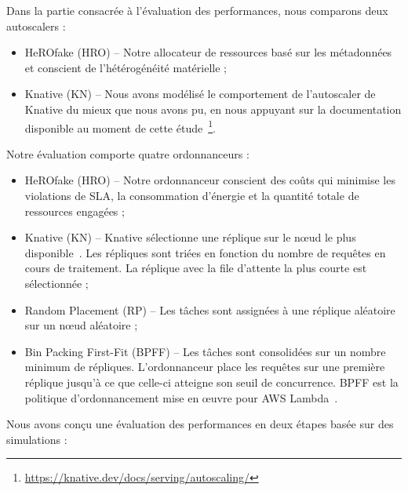 Dans la partie consacrée à l'évaluation des performances, nous comparons deux autoscalers :

\begin{itemize}
    \item HeROfake (HRO) -- Notre allocateur de ressources basé sur les métadonnées et conscient de l'hétérogénéité matérielle ;
    \item Knative (KN) -- Nous avons modélisé le comportement de l'autoscaler de Knative du mieux que nous avons pu, en nous appuyant sur la documentation disponible au moment de cette étude~\footnote{\href{https://knative.dev/docs/serving/autoscaling/}{https://knative.dev/docs/serving/autoscaling/}}.
\end{itemize}

Notre évaluation comporte quatre ordonnanceurs :

\begin{itemize}
    \item HeROfake (HRO) -- Notre ordonnanceur conscient des coûts qui minimise les violations de \gls{SLA}, la consommation d'énergie et la quantité totale de ressources engagées ;
    \item Knative (KN) -- Knative sélectionne une réplique sur le nœud le plus disponible~\cite{sureshENSUREEfficientScheduling2020}. Les répliques sont triées en fonction du nombre de requêtes en cours de traitement. La réplique avec la file d'attente la plus courte est sélectionnée ;
    \item Random Placement (RP) -- Les tâches sont assignées à une réplique aléatoire sur un nœud aléatoire ;
    \item Bin Packing First-Fit (BPFF) -- Les tâches sont consolidées sur un nombre minimum de répliques. L'ordonnanceur place les requêtes sur une première réplique jusqu'à ce que celle-ci atteigne son seuil de concurrence. BPFF est la politique d'ordonnancement mise en œuvre pour \gls{AWS} Lambda~\cite{wangPeekingCurtainsServerlessb}.
\end{itemize}

Nous avons conçu une évaluation des performances en deux étapes basée sur des simulations :

